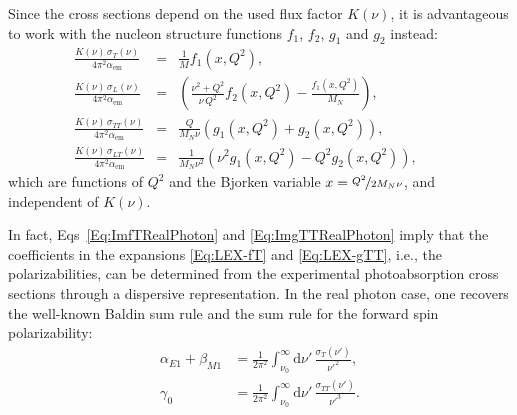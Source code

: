 \documentclass[twocolumn,prc,showpacs,nofootinbib,preprintnumbers,amsmath,amssymb,superscriptaddress]{revtex4-1}
\def\bea{\begin{eqnarray}}
\def\eea{\end{eqnarray}}
\def\al{\alpha}
\def\dd{\mathrm{d}}
\begin{document}
 Since the cross sections depend on the used flux factor $K(\nu)$, it is advantageous to work with the nucleon structure functions $f_1$, $f_2$, $g_1$ and $g_2$ instead:
 \begin{subequations}
 \bea
\frac{K(\nu) \,\sigma_T (\nu)}{4\pi^2 \al_\mathrm{em}}&=&\frac{1}{M} f_1(x,Q^2),\\
\frac{K(\nu) \,\sigma_L (\nu)}{4\pi^2 \al_\mathrm{em}}&=& \left(\frac{\nu^2+Q^2}{\nu\, Q^2} f_2(x,Q^2)-\frac{f_1(x,Q^2)}{M_N} \right),\;\\
\frac{K(\nu) \,\sigma_{TT} (\nu)}{ 4\pi^2 \al_\mathrm{em}}&=&\frac{ Q}{M_N \nu} \left(g_1(x,Q^2)+g_2(x,Q^2)\right),\\
\frac{K(\nu) \,\sigma_{LT} (\nu)}{4\pi^2 \al_\mathrm{em}}&=&\frac{1 }{M_N\nu^2}\left(\nu^2 g_1(x,Q^2)-Q^2 g_2(x,Q^2)\right),\qquad
\eea
 \end{subequations}
 which are functions of $Q^2$ and the Bjorken variable $x=\nicefrac{Q^2}{2M_N \nu}$, and independent of $K(\nu)$.
 
 
In fact, Eqs~\eqref{Eq:ImfTRealPhoton} and \eqref{Eq:ImgTTRealPhoton} imply that the coefficients in the expansions \eqref{Eq:LEX-fT} and \eqref{Eq:LEX-gTT},  i.e., the polarizabilities, can be determined from the experimental photoabsorption cross sections through a dispersive representation.
In the real photon case, one recovers the well-known Baldin sum rule and the sum rule for the forward spin polarizability:
 \begin{align}
\alpha_{E1}+\beta_{M1}&= \frac{1}{2 \pi^2} \int_{\nu_0}^\infty\!\!\!\! \dd\nu'\, \frac{\sigma_T (\nu')}{\nu'^2},\\
\gamma_0&= \frac{1}{2 \pi^2} \int_{\nu_0}^\infty\!\!\!\! \dd\nu'\, \frac{\sigma_{TT} (\nu')}{\nu'^3}.
\end{align}
\end{document}
